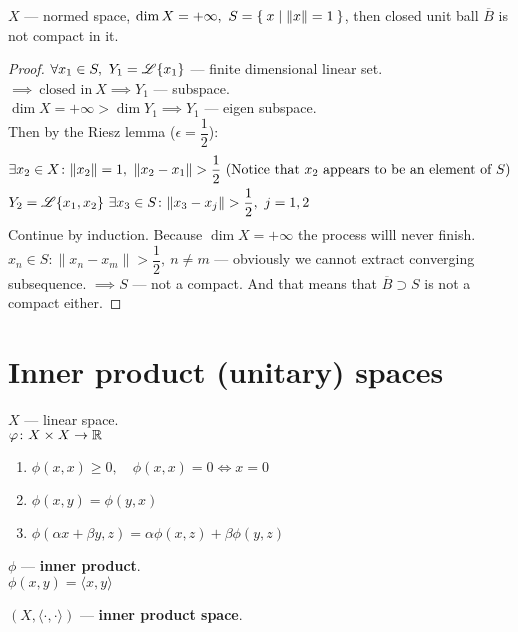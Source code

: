 \begin{cor}
  $X$ --- normed space, $\dim{X} = +\infty,\ S = \Set{x | \|x\| = 1}$, then
  closed unit ball $\overline{B}$ is not compact in it.
\end{cor}

\begin{proof}
  $\forall x_1 \in S,\ Y_1 = \mathscr{L}\{x_1\}$ --- finite dimensional linear set.
  $\implies\ \text{closed in}\ X \implies Y_1$ --- subspace. \\
  $\dim{X} = + \infty > \dim{Y_1} \implies Y_1$ --- eigen subspace. \\
  Then by the Riesz lemma ($\epsilon = \dfrac 12$):
  \begin{align*}
    & \exists x_2 \in X \colon \|x_2\| = 1,\ \|x_2 - x_1\| > \dfrac 12\ \textnormal{(Notice that $x_2$ appears to be an element of $S$)} \\
    & Y_2 = \mathscr{L}\{x_1, x_2\}\ \exists x_3 \in S\colon \|x_3 - x_j\| > \dfrac 12,\ j = 1,2
  \end{align*}
  Continue by induction. Because $\dim{X} = + \infty$ the process willl never
  finish. \\
  $x_n \in S \colon \|x_n - x_m\| > \dfrac 12,\ n \neq m$ --- obviously we
  cannot extract converging subsequence. $\implies S$ --- not a compact. And
  that means that $\overline{B} \supset S$ is not a compact either. 
\end{proof}

\section{Inner product (unitary) spaces}
\begin{defn}
  $X$ --- linear space. \\
  $\varphi \colon X \times X \to \mathbb{R}$
  \begin{enumerate}
      \item $\phi(x, x) \ge 0,\quad \phi(x, x) = 0 \iff x = 0$
  \item $\phi(x, y) = \phi(y, x)$
  \item $\phi(\alpha x + \beta y, z) = \alpha \phi(x, z) + \beta \phi(y, z)$
  \end{enumerate}
  $\phi$ --- \textbf{inner product}. \\
  $\phi(x, y) = \langle x, y \rangle$
\end{defn}

\begin{defn}
  $(X, \langle \cdot, \cdot \rangle)$ --- \textbf{inner product space}.
\end{defn}

